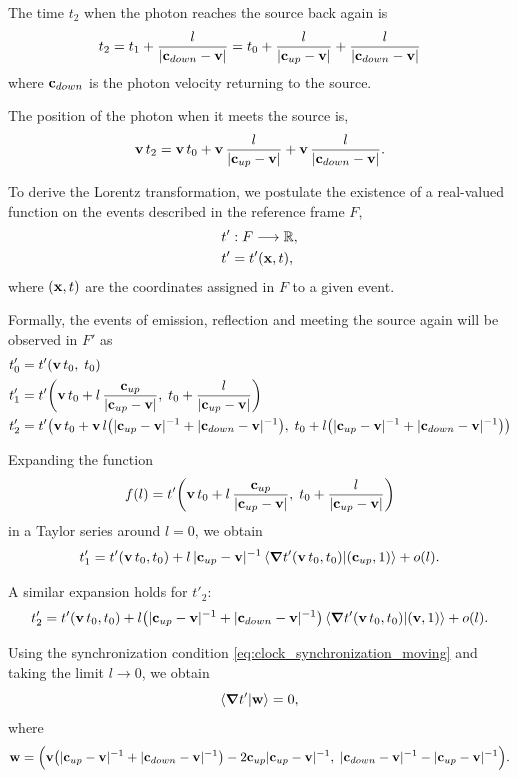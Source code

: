 \documentclass[12pt]{article}
\begin{document}
The time $t_2$ when the photon reaches the source back again is
\[
  t_2 = t_1 + \frac{l}{|\vb{c}_{down} - \vb{v}|}
      = t_0 + \frac{l}{|\vb{c}_{up} - \vb{v}|} + \frac{l}{|\vb{c}_{down} - \vb{v}|}
\]
where $\vb{c}_{down}$ is the photon velocity returning to the source. \par

The position of the photon when it meets the source is,
\[
  \vb{v}\, t_2
  =
  \vb{v}\, t_0
  +
  \vb{v}\,\frac{l}{|\vb{c}_{up}-\vb{v}|}
  +
  \vb{v}\,\frac{l}{|\vb{c}_{down}-\vb{v}|}.
\]

To derive the Lorentz transformation, we postulate the existence of a
real-valued function on the events described in the reference frame $F$,
\begin{align}
  t' &: F \longrightarrow \mathbb{R}, \\
  t' &= t'(\vb{x},t),
\end{align}
where $(\vb{x},t)$ are the coordinates assigned in $F$ to a given event.

Formally, the events of emission, reflection and meeting the source again will be observed
in $F'$ as
\begin{align}
  t'_0 &= t'(\vb{v}\, t_0,\; t_0) \\
  t'_1 &= t'\!\left(
    \vb{v}\, t_0 + l\,\frac{\vb{c}_{up}}{|\vb{c}_{up} - \vb{v}|},\;
    t_0 + \frac{l}{|\vb{c}_{up} - \vb{v}|}
  \right) \\
  t'_2 &= t'\!\left(
    \vb{v}\, t_0 + \vb{v}\, l
      \bigl(|\vb{c}_{up} - \vb{v}|^{-1} + |\vb{c}_{down} - \vb{v}|^{-1}\bigr),\;
    t_0 + l\bigl(|\vb{c}_{up} - \vb{v}|^{-1} + |\vb{c}_{down} - \vb{v}|^{-1}\bigr)
  \right)
\end{align}
 
Expanding the function
\[
  f(l)
  =
  t'\!\left(
    \vb{v}\,t_0
    +
    l\,\frac{\vb{c}_{up}}
      {|\vb{c}_{up}-\vb{v}|},
    \;
    t_0
    +
    \frac{l}{|\vb{c}_{up}-\vb{v}|}
  \right)
\]
in a Taylor series around $l=0$, we obtain
\[
  t'_1
  =
  t'(\vb{v}\,t_0,t_0)
  +
  l\,|\vb{c}_{up}-\vb{v}|^{-1}
  \ip{
    \grad t'(\vb{v}\,t_0,t_0)
  }{
    (\vb{c}_{up},1)
  }
  +
  o(l).
\]

A similar expansion holds for $t'_2$:
\[
  t'_2
  =
  t'(\vb{v}\,t_0,t_0)
  +
  l\bigl(
    |\vb{c}_{up}-\vb{v}|^{-1}
    +
    |\vb{c}_{down}-\vb{v}|^{-1}
  \bigr)
  \ip{
    \grad t'(\vb{v}\,t_0,t_0)
  }{
    (\vb{v},1)
  }
  +
  o(l).
\]

Using the synchronization condition
\eqref{eq:clock_synchronization_moving} and taking the limit $l\to0$,
we obtain
\[
  \ip{\grad t'}{\vb{w}}=0,
\]
where
\[
  \vb{w}
  =
  \Bigl(
    \vb{v}\bigl(
      |\vb{c}_{up}-\vb{v}|^{-1}
      +
      |\vb{c}_{down}-\vb{v}|^{-1}
    \bigr)
    -
    2\vb{c}_{up}|\vb{c}_{up}-\vb{v}|^{-1},
    \;
    |\vb{c}_{down}-\vb{v}|^{-1}
    -
    |\vb{c}_{up}-\vb{v}|^{-1}
  \Bigr).
\]
\end{document}
